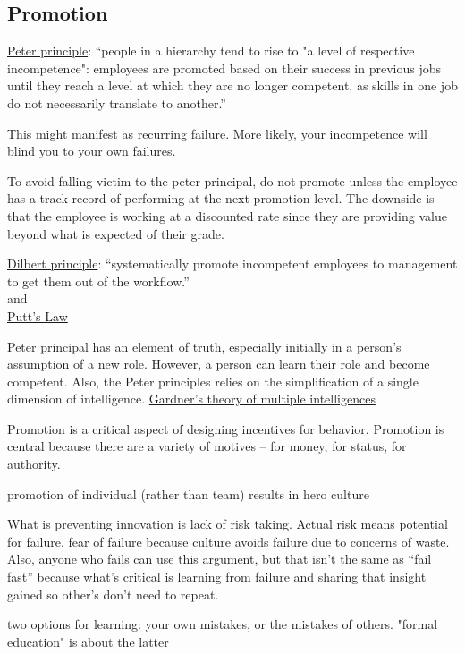 \subsection{Promotion}


\href{https://en.wikipedia.org/wiki/Peter_principle}{Peter principle}: ``people in a hierarchy tend to rise to "a level of respective incompetence": employees are promoted based on their success in previous jobs until they reach a level at which they are no longer competent, as skills in one job do not necessarily translate to another.''

This might manifest as recurring failure. More likely, your incompetence will blind you to your own failures.

To avoid falling victim to the peter principal, do not promote unless the employee has a track record of performing at the next promotion level. The downside is that the employee is working at a discounted rate since they are providing value beyond what is expected of their grade.


\href{https://en.wikipedia.org/wiki/Dilbert_principle}{Dilbert principle}: ``systematically promote incompetent employees to management to get them out of the workflow.''\\
and\\
\href{https://en.wikipedia.org/wiki/Putt\%27s_Law_and_the_Successful_Technocrat}{Putt's Law}





Peter principal \cite{1970_Peter} has an element of truth, especially initially in a person's assumption of a new role. However, a person can learn their role and become competent. Also, the Peter principles relies on the simplification of a single dimension of intelligence. 
\href{https://en.wikipedia.org/wiki/Theory_of_multiple_intelligences}{Gardner's theory of multiple intelligences}


Promotion is a critical aspect of designing incentives for behavior. Promotion is central because there are a variety of motives -- for money, for status, for authority. 

promotion of individual (rather than team) results in hero culture

What is preventing innovation is lack of risk taking. Actual risk means potential for failure. fear of failure because culture avoids failure due to concerns of waste. Also, anyone who fails can use this argument, but that isn't the same as ``fail fast'' because what's critical is learning from failure and sharing that insight gained so other's don't need to repeat. 

two options for learning: your own mistakes, or the mistakes of others. "formal education" is about the latter
